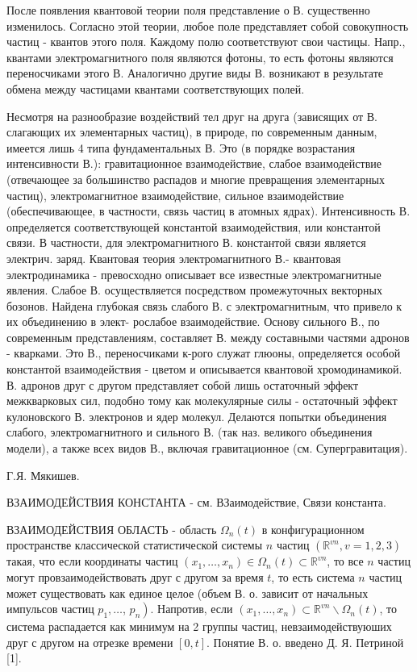 \documentclass[10pt]{article}
\begin{document}
После появления квантовой теории поля представление о В. существенно изменилось. Согласно этой теории, любое поле представляет собой совокупность частиц - квантов этого поля. Каждому полю соответствуют свои частицы. Напр., квантами электромагнитного поля являются фото$н ы$, то есть фотоны являются переносчиками этого В. Аналогично другие виды В. возникают в результате обмена между частицами квантами соответствующих полей.



Несмотря на разнообразие воздействий тел друг на друга (зависящих от В. слагающих их элементарных частиц), в природе, по современным данным, имеется лишь 4 типа фундаментальных В. Это (в порядке возрастания интенсивности В.): гравитационное взаимодействие, слабое взаимодействие (отвечающее за большинство распадов и многие превращения элементарных частиц), электромагнитное взаимодействие, сильное взаимодействие (обеспечивающее, в частности, связь частиц в атомных ядрах). Интенсивность В. определяется соответствующей константой взаимодействия, или константой связи. В частности, для электромагнитного В. константой связи является электрич. заряд. Квантовая теория электромагнитного В.- квантовая электродинамика - превосходно описывает все известные электромагнитные явления. Слабое В. осуществляется посредством промежуточных векторных бозонов. Найдена глубокая связь слабого В. с электромагнитным, что привело к их объединению в элект- рослабое взаимодействие. Основу сильного В., по современным представлениям, составляет В. между составными частями адронов - кварками. Это В., переносчиками к-рого служат глюоны, определяется особой константой взаимодействия - цветом и описывается квантовой хромодинамикой. В. адронов друг с другом представляет собой лишь остаточный эффект межкварковых сил, подобно тому как молекулярные силы - остаточный эффект кулоновского В. электронов и ядер молекул. Делаются попытки объединения слабого, электромагнитного и сильного В. (так наз. великого объединения модели), а также всех видов В., включая гравитационное (см. Супергравитация).



Г.Я. Мякишев.



ВЗАИМОДЕЙСТВИЯ КОНСТАНТА - см. ВЗаимодействие, Связи константа.



ВЗАИМОДЕЙСТВИЯ ОБЛАСТЬ - область $\Omega_{n}(t)$ в конфигурационном пространстве классической статистической системы $n$ частиц $\left(\mathbb{R}^{v n}, v=1,2,3\right)$ такая, что если координаты частиц $\left(x_{1}, \ldots, x_{n}\right) \in \Omega_{n}(t) \subset \mathbb{R}^{v n}$, то все $n$ частиц могут провзаимодействовать друг с другом за время $t$, то есть система $n$ частиц может существовать как единое целое (объем В. о. зависит от начальных импульсов частиц $p_{1}, \ldots$, $\left.p_{n}\right)$. Напротив, если $\left(x_{1}, \ldots, x_{n}\right) \subset \mathbb{R}^{v n} \backslash \Omega_{n}(t)$, то система распадается как минимум на 2 группы частиц, невзаимодействуюших друг с другом на отрезке времени $[0, t]$. Понятие В. о. введено Д. Я. Петриной [1].
\end{document}
